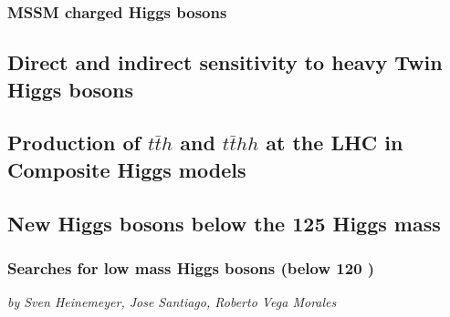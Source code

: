 \documentclass[../report.tex]{subfiles}
\providecommand{\main}{..}
\begin{document}
\subsubsection{MSSM charged Higgs bosons}



\subsection{Direct and indirect sensitivity to heavy Twin Higgs bosons}


\subsection{Production of $t\bar{t}h$ and $t\bar{t}h h$ at the LHC in Composite Higgs models}\label{Sec:9.7}


%







\subsection{New Higgs bosons below the 125 \UGeV Higgs mass}\label{Sec:9.8}

\subsubsection{Searches for low mass Higgs bosons (below 120 \UGeV)}
\begin{center}
    \textit{by Sven Heinemeyer, Jose Santiago, Roberto Vega Morales}
\end{center}

\end{document}
